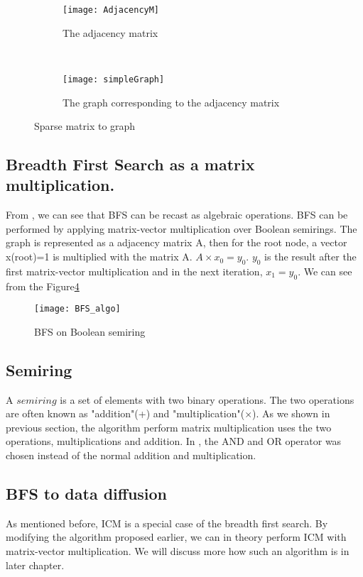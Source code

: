 {\begin{figure}
	\begin{subfigure}{0.5\textwidth}
	\texttt{[image: AdjacencyM]}
	\caption{The adjacency matrix}
	\label{fig:AdjacencyM}
	\end{subfigure}
	~
	\begin{subfigure}{0.5\textwidth}
	\texttt{[image: simpleGraph]}
	\caption{The graph corresponding to the adjacency matrix}
	\label{fig:matrix}
	\end{subfigure}
 	\caption{Sparse matrix to graph}
 	\label{AdjaToMatrix}
\end{figure}

\subsection{Breadth First Search as a matrix multiplication.}
From \cite{AlgoToMath}, we can see that BFS can be recast as algebraic operations. BFS can be performed by applying matrix-vector multiplication over Boolean semirings\cite{HybridBFS2015}. The graph is represented as a adjacency matrix A, then for the root node, a vector x(root)=1 is multiplied with the matrix A. $A \times x_0 = y_0$. $y_0$ is the result after the first matrix-vector multiplication and in the next iteration, $x_1 = y_0$. We can see from the Figure\ref{fig:bfsMatrix}

\begin{figure}
	
	\texttt{[image: BFS\_algo]}
	\caption{BFS on Boolean semiring}
	\label{fig:bfsMatrix}
\end{figure}



\subsection{Semiring}
A $semiring$ is a set of elements with two binary operations. The two operations are often known as "addition"(+) and "multiplication"($\times$).  As we shown in previous section, the algorithm perform matrix multiplication uses the two operations, multiplications and addition. In \cite{HYbridBFS2015}, the AND and OR operator was chosen instead of the normal addition and multiplication. 


\subsection{BFS to data diffusion}
As mentioned before, ICM is a special case of the breadth first search. By modifying the algorithm proposed earlier, we can in theory perform ICM with matrix-vector multiplication. We will discuss more how such an algorithm is in later chapter. 


}
